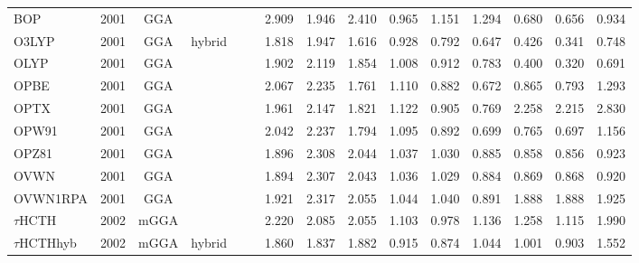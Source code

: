 \begin{landscape}
\begin{longtable}{ll:cccc:rrr:rrr:rrr}
    BOP              & 2001 & GGA  &          &             &           & 2.909             & 1.946             & 2.410  & 0.965              & 1.151             & 1.294  & 0.680   & 0.656 & 0.934 \\
    O3LYP            & 2001 & GGA  & hybrid   &             &           & 1.818             & 1.947             & 1.616  & 0.928              & 0.792             & 0.647  & 0.426   & 0.341 & 0.748 \\
    OLYP             & 2001 & GGA  &          &             &           & 1.902             & 2.119             & 1.854  & 1.008              & 0.912             & 0.783  & 0.400   & 0.320 & 0.691 \\
    OPBE             & 2001 & GGA  &          &             &           & 2.067             & 2.235             & 1.761  & 1.110              & 0.882             & 0.672  & 0.865   & 0.793 & 1.293 \\
    OPTX             & 2001 & GGA  &          &             &           & 1.961             & 2.147             & 1.821  & 1.122              & 0.905             & 0.769  & 2.258   & 2.215 & 2.830 \\
    OPW91            & 2001 & GGA  &          &             &           & 2.042             & 2.237             & 1.794  & 1.095              & 0.892             & 0.699  & 0.765   & 0.697 & 1.156 \\
    OPZ81            & 2001 & GGA  &          &             &           & 1.896             & 2.308             & 2.044  & 1.037              & 1.030             & 0.885  & 0.858   & 0.856 & 0.923 \\
    OVWN             & 2001 & GGA  &          &             &           & 1.894             & 2.307             & 2.043  & 1.036              & 1.029             & 0.884  & 0.869   & 0.868 & 0.920 \\
    OVWN1RPA         & 2001 & GGA  &          &             &           & 1.921             & 2.317             & 2.055  & 1.044              & 1.040             & 0.891  & 1.888   & 1.888 & 1.925 \\
    $\tau$HCTH            & 2002 & mGGA &          &             &           & 2.220             & 2.085             & 2.055  & 1.103              & 0.978             & 1.136  & 1.258   & 1.115 & 1.990 \\
    $\tau$HCTHhyb         & 2002 & mGGA & hybrid   &             &           & 1.860             & 1.837             & 1.882  & 0.915              & 0.874             & 1.044  & 1.001   & 0.903 & 1.552 \\

\end{longtable}
\end{landscape}
